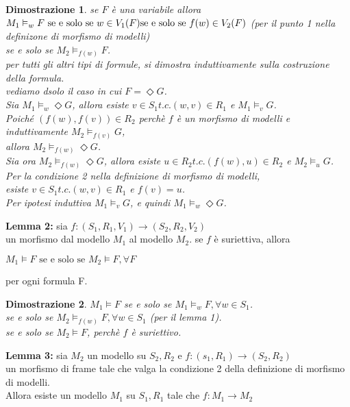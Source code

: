 \documentclass[a4paper,12pt]{article}
\theoremstyle{def}
\theoremstyle{prop}
\theoremstyle{esempio}
\theoremstyle{dimostrazione}
\newtheorem*{dimostrazione}{Dimostrazione}
\theoremstyle{teo}
\theoremstyle{osservazione}
\begin{document}
\begin{dimostrazione}
	se \(F\) è una variabile allora \(M_1 \vDash_w F \text{ se e solo se } w \in V_1(F)\\
	\text{se e solo se } f(w) \in V_2(F)\) (per il punto 1 nella definizone di morfismo di modelli)\\
	se e solo se \(M_2 \vDash_{f(w)} F\).\\
	per tutti gli altri tipi di formule, si dimostra induttivamente sulla costruzione della formula.\\
	vediamo dsolo il caso in cui \(F = \Diamond G\).\\
	Sia \(M_1 \vDash_w \Diamond G\), allora esiste \(v \in S_1 t.c. (w,v) \in R_1\) e \(M_1 \vDash_v G\).\\
	Poiché \((f(w),f(v)) \in R_2\) perchè \(f\) è un morfismo di modelli e induttivamente \(M_2 \vDash_{f(v)} G\),\\
	allora \(M_2 \vDash_{f(w)} \Diamond G\).\\
	Sia ora \(M_2 \vDash_{f(w)} \Diamond G\), allora esiste \(u \in R_2 t.c. (f(w),u) \in R_2\) e \(M_2 \vDash_u G\).\\
	Per la condizione 2 nella definizione di morfismo di modelli, \\
	esiste \(v \in S_1 t.c. (w,v) \in R_1\) e \(f(v) = u\).\\
	Per ipotesi induttiva \(M_1 \vDash_v G\), e quindi \(M_1 \vDash_w \Diamond G\).
\end{dimostrazione}
\textbf{Lemma 2:} sia \(f: (S_1,R_1,V_1) \rightarrow (S_2,R_2,V_2)\)\\
un morfismo dal modello \(M_1\) al modello \(M_2\). se \(f\) è suriettiva, allora
\begin{center}
	\(M_1 \vDash F \text{ se e solo se } M_2 \vDash F, \forall F\)
\end{center}
per ogni formula F.
\begin{dimostrazione}
	\(M_1 \vDash F\) se e solo se \(M_1 \vDash_w F, \forall w \in S_1\).\\
	se e solo se \(M_2 \vDash_{f(w)} F, \forall w \in S_1\) (per il lemma 1).\\
	se e solo se \(M_2 \vDash F\), perchè \(f\) è suriettivo.
\end{dimostrazione}
\textbf{Lemma 3:} sia \(M_2\) un modello su \(S_2, R_2\) e \(f: (s_1,R_1) \rightarrow (S_2, R_2)\)\\
un morfismo di frame tale che valga la condizione 2 della definizione di morfismo di modelli.\\
Allora esiste un modello \(M_1\) su \(S_1, R_1\) tale che \(f: M_1 \rightarrow M_2\)\\
\end{document}
